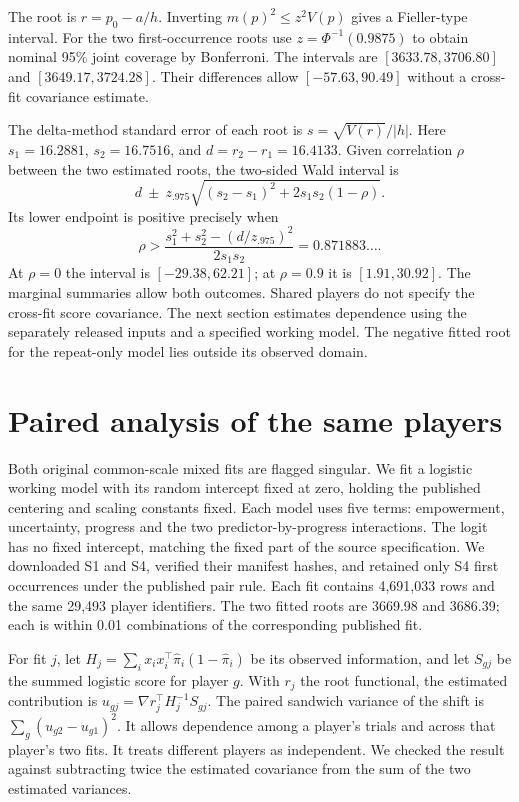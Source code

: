 \documentclass[11pt]{article}
\begin{document}
The root is $r=p_0-a/h$. Inverting $m(p)^2\le z^2V(p)$ gives a Fieller-type interval. For the two first-occurrence roots use $z=\Phi^{-1}(0.9875)$ to obtain nominal 95\% joint coverage by Bonferroni. The intervals are $[3633.78,3706.80]$ and $[3649.17,3724.28]$. Their differences allow $[-57.63,90.49]$ without a cross-fit covariance estimate.

The delta-method standard error of each root is $s=\sqrt{V(r)}/|h|$. Here $s_1=16.2881$, $s_2=16.7516$, and $d=r_2-r_1=16.4133$. Given correlation $\rho$ between the two estimated roots, the two-sided Wald interval is
\[
d\ \pm\ z_{.975}\sqrt{(s_2-s_1)^2+2s_1s_2(1-\rho)} .
\]
Its lower endpoint is positive precisely when
\[
\rho>\frac{s_1^2+s_2^2-(d/z_{.975})^2}{2s_1s_2}=0.871883\ldots .
\]
At $\rho=0$ the interval is $[-29.38,62.21]$; at $\rho=0.9$ it is $[1.91,30.92]$. The marginal summaries allow both outcomes. Shared players do not specify the cross-fit score covariance. The next section estimates dependence using the separately released inputs and a specified working model. The negative fitted root for the repeat-only model lies outside its observed domain.
\newpage
\section{Paired analysis of the same players}
Both original common-scale mixed fits are flagged singular. We fit a logistic working model with its random intercept fixed at zero, holding the published centering and scaling constants fixed. Each model uses five terms: empowerment, uncertainty, progress and the two predictor-by-progress interactions. The logit has no fixed intercept, matching the fixed part of the source specification. We downloaded S1 and S4, verified their manifest hashes, and retained only S4 first occurrences under the published pair rule. Each fit contains 4,691,033 rows and the same 29,493 player identifiers. The two fitted roots are 3669.98 and 3686.39; each is within 0.01 combinations of the corresponding published fit.

For fit $j$, let $H_j=\sum_i x_ix_i^\top \hat\pi_i(1-\hat\pi_i)$ be its observed information, and let $S_{gj}$ be the summed logistic score for player $g$. With $r_j$ the root functional, the estimated contribution is $u_{gj}=\nabla r_j^\top H_j^{-1}S_{gj}$. The paired sandwich variance of the shift is $\sum_g(u_{g2}-u_{g1})^2$. It allows dependence among a player's trials and across that player's two fits. It treats different players as independent. We checked the result against subtracting twice the estimated covariance from the sum of the two estimated variances.
\end{document}
